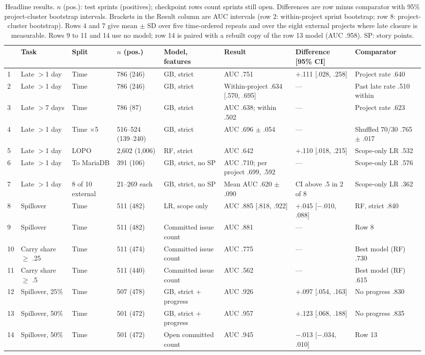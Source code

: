 \documentclass[conference]{IEEEtran}
\begin{document}
\begin{table}[!t]
\centering\scriptsize
\caption{Headline results. $n$ (pos.): test sprints (positives); checkpoint rows count sprints still open. Differences are row minus comparator with 95\% project-cluster bootstrap intervals. Brackets in the Result column are AUC intervals (row 2: within-project sprint bootstrap; row 8: project-cluster bootstrap). Rows 4 and 7 give mean $\pm$ SD over five time-ordered repeats and over the eight external projects where late closure is measurable. Rows 9 to 11 and 14 use no model; row 14 is paired with a rebuilt copy of the row 13 model (AUC .958). SP: story points.}
\label{tab:headline}
\setlength{\tabcolsep}{2pt}
\begin{tabular}{llllllll}
\hline
 & Task & Split & $n$ (pos.) & Model, features & Result & Difference [95\% CI] & Comparator\\
\hline
1 & Late $>$1 day & Time & 786 (246) & GB, strict & AUC .751 & $+$.111 [.028, .258] & Project rate .640\\
2 & Late $>$1 day & Time & 786 (246) & GB, strict & Within-project .634 [.570, .695] & --- & Past late rate .510 within\\
3 & Late $>$7 days & Time & 786 (87) & GB, strict & AUC .638; within .502 & --- & Project rate .623\\
4 & Late $>$1 day & Time $\times$5 & 516--524 (139--240) & GB, strict & AUC .696 $\pm$ .054 & --- & Shuffled 70/30 .765 $\pm$ .017\\
5 & Late $>$1 day & LOPO & 2,602 (1,006) & RF, strict & AUC .642 & $+$.110 [.018, .215] & Scope-only LR .532\\
6 & Late $>$1 day & To MariaDB & 391 (106) & GB, strict, no SP & AUC .710; per project .699, .592 & --- & Scope-only LR .576\\
7 & Late $>$1 day & 8 of 10 external & 21--269 each & GB, strict, no SP & Mean AUC .620 $\pm$ .090 & CI above .5 in 2 of 8 & Scope-only LR .362\\
8 & Spillover & Time & 511 (482) & LR, scope only & AUC .885 [.818, .922] & $+$.045 [$-$.010, .088] & RF, strict .840\\
9 & Spillover & Time & 511 (482) & Committed issue count & AUC .881 & --- & Row 8\\
10 & Carry share $\geq$ .25 & Time & 511 (474) & Committed issue count & AUC .775 & --- & Best model (RF) .730\\
11 & Carry share $\geq$ .5 & Time & 511 (440) & Committed issue count & AUC .562 & --- & Best model (RF) .615\\
12 & Spillover, 25\% & Time & 507 (478) & GB, strict + progress & AUC .926 & $+$.097 [.054, .163] & No progress .830\\
13 & Spillover, 50\% & Time & 501 (472) & GB, strict + progress & AUC .957 & $+$.123 [.068, .188] & No progress .835\\
14 & Spillover, 50\% & Time & 501 (472) & Open committed count & AUC .945 & $-$.013 [$-$.034, .010] & Row 13\\
\hline
\end{tabular}
\end{table}
\end{document}
